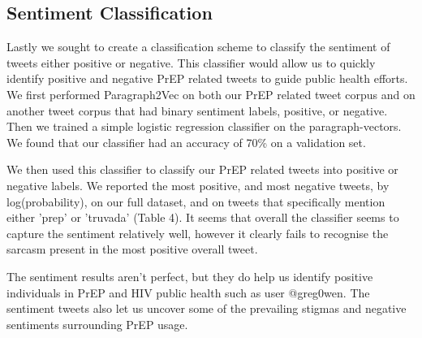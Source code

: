 \documentclass{sig-alternate-05-2015}
\begin{document}
\subsection{Sentiment Classification}


Lastly we sought to create a classification scheme to classify the sentiment of tweets either positive or negative. This classifier would allow us to quickly identify positive and negative PrEP related tweets to guide public health efforts. We first performed Paragraph2Vec on both our PrEP related tweet corpus and on another tweet corpus that had binary sentiment labels, positive, or negative. Then we trained a simple logistic regression classifier on the paragraph-vectors. We found that our classifier had an accuracy of 70\% on a validation set.

We then used this classifier to classify our PrEP related tweets into positive or negative labels. We reported the most positive, and most negative tweets, by log(probability), on our full dataset, and on tweets that specifically mention either 'prep' or 'truvada' (Table 4). It seems that overall the classifier seems to capture the sentiment relatively well, however it clearly fails to recognise the sarcasm present in the most positive overall tweet.

The sentiment results aren't perfect, but they do help us identify positive individuals in PrEP and HIV public health such as user @greg0wen. The sentiment tweets also let us uncover some of the prevailing stigmas and negative sentiments surrounding PrEP usage.
\end{document}
